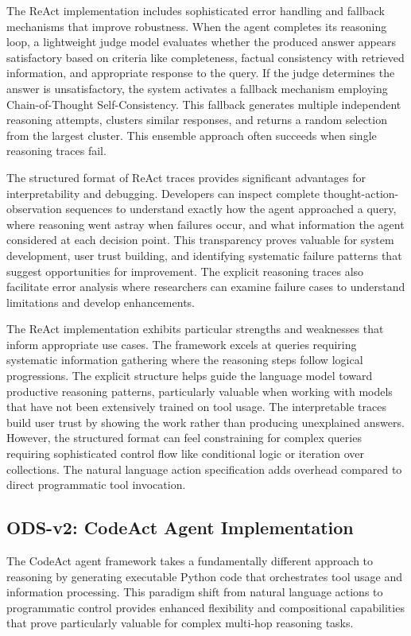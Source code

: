 The ReAct implementation includes sophisticated error handling and fallback mechanisms that improve robustness. When the agent completes its reasoning loop, a lightweight judge model evaluates whether the produced answer appears satisfactory based on criteria like completeness, factual consistency with retrieved information, and appropriate response to the query. If the judge determines the answer is unsatisfactory, the system activates a fallback mechanism employing Chain-of-Thought Self-Consistency. This fallback generates multiple independent reasoning attempts, clusters similar responses, and returns a random selection from the largest cluster. This ensemble approach often succeeds when single reasoning traces fail.

The structured format of ReAct traces provides significant advantages for interpretability and debugging. Developers can inspect complete thought-action-observation sequences to understand exactly how the agent approached a query, where reasoning went astray when failures occur, and what information the agent considered at each decision point. This transparency proves valuable for system development, user trust building, and identifying systematic failure patterns that suggest opportunities for improvement. The explicit reasoning traces also facilitate error analysis where researchers can examine failure cases to understand limitations and develop enhancements.

The ReAct implementation exhibits particular strengths and weaknesses that inform appropriate use cases. The framework excels at queries requiring systematic information gathering where the reasoning steps follow logical progressions. The explicit structure helps guide the language model toward productive reasoning patterns, particularly valuable when working with models that have not been extensively trained on tool usage. The interpretable traces build user trust by showing the work rather than producing unexplained answers. However, the structured format can feel constraining for complex queries requiring sophisticated control flow like conditional logic or iteration over collections. The natural language action specification adds overhead compared to direct programmatic tool invocation.

\subsection{ODS-v2: CodeAct Agent Implementation}

The CodeAct agent framework takes a fundamentally different approach to reasoning by generating executable Python code that orchestrates tool usage and information processing. This paradigm shift from natural language actions to programmatic control provides enhanced flexibility and compositional capabilities that prove particularly valuable for complex multi-hop reasoning tasks.

